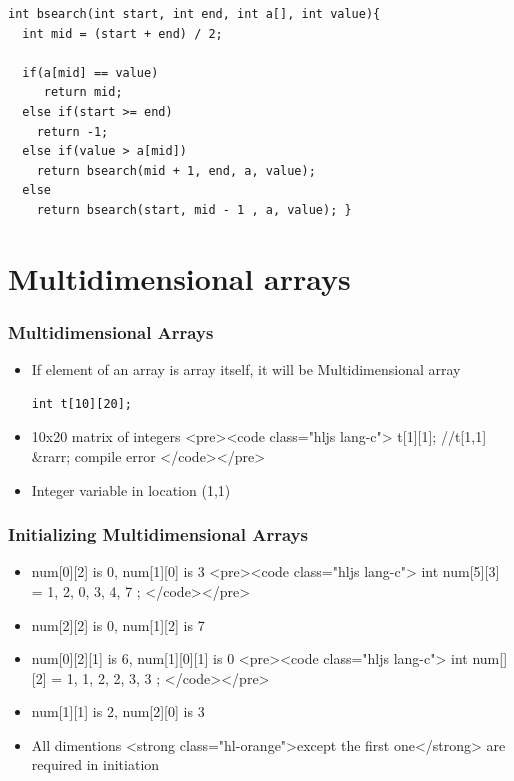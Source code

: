 \documentclass{../c-lecture}
\begin{document}
\begin{frame}
  \begin{verbatim}
int bsearch(int start, int end, int a[], int value){
  int mid = (start + end) / 2;

  if(a[mid] == value)
     return mid;
  else if(start >= end)
    return -1;
  else if(value > a[mid])
    return bsearch(mid + 1, end, a, value);
  else
    return bsearch(start, mid - 1 , a, value); }
  \end{verbatim}
\end{frame}

\section{Multidimensional arrays}

\begin{frame}
  \frametitle{Multidimensional Arrays}
  \begin{itemize}
    \item
      If element of an array is array itself, it will be Multidimensional array

    \begin{verbatim}
int t[10][20];
    \end{verbatim}
    \item 10x20 matrix of integers
    <pre><code class="hljs lang-c">
t[1][1]; //t[1,1] &rarr; compile error
    </code></pre>
    \item Integer variable in location (1,1)
  \end{itemize}
\end{frame}
\begin{frame}
  \begin{frame}
    \frametitle{Initializing Multidimensional Arrays}
    \begin{itemize}
      <pre><code class="hljs lang-c">
int num[2][3] = {1, 2, 0, 3, 4, 7};
int num[2][3] = { {1, 2, 0}, {3, 4, 7} };
      </code></pre>
      \item num[0][2] is 0, num[1][0] is 3
      <pre><code class="hljs lang-c">
int num[5][3] = { {1, 2, 0}, {3, 4, 7} };
      </code></pre>
      \item num[2][2] is 0, num[1][2] is 7
    \end{itemize}
  \end{frame}
  \begin{frame}
    \begin{itemize}
      <pre><code class="hljs lang-c">
int num[2][3][2] = { { {1, 2}, {3, 4}, {5, 6} }, { {1}, {2}, {3} } };
      </code></pre>
      \item num[0][2][1] is 6, num[1][0][1] is 0
      <pre><code class="hljs lang-c">
int num[][2] = { {1, 1}, {2, 2}, {3, 3} };
      </code></pre>
      \item num[1][1] is 2, num[2][0] is 3
      \item
        All dimentions
        <strong class="hl-orange">except the first one</strong> are required in
        initiation

    \end{itemize}
  \end{frame}
\end{frame}
\end{document}
